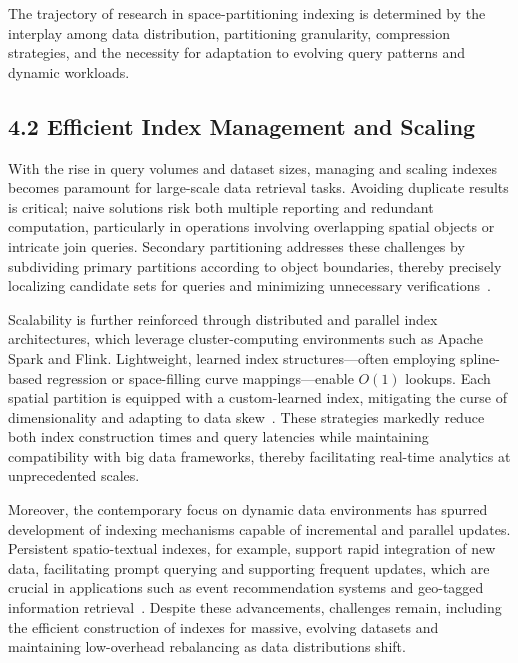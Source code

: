 \documentclass[11pt]{article}
\begin{document}
The trajectory of research in space-partitioning indexing is determined by the interplay among data distribution, partitioning granularity, compression strategies, and the necessity for adaptation to evolving query patterns and dynamic workloads.

\subsection{4.2 Efficient Index Management and Scaling}

With the rise in query volumes and dataset sizes, managing and scaling indexes becomes paramount for large-scale data retrieval tasks. Avoiding duplicate results is critical; naive solutions risk both multiple reporting and redundant computation, particularly in operations involving overlapping spatial objects or intricate join queries. Secondary partitioning addresses these challenges by subdividing primary partitions according to object boundaries, thereby precisely localizing candidate sets for queries and minimizing unnecessary verifications~\cite{ref114}.

Scalability is further reinforced through distributed and parallel index architectures, which leverage cluster-computing environments such as Apache Spark and Flink. Lightweight, learned index structures—often employing spline-based regression or space-filling curve mappings—enable $O(1)$ lookups. Each spatial partition is equipped with a custom-learned index, mitigating the curse of dimensionality and adapting to data skew~\cite{ref51,ref111}. These strategies markedly reduce both index construction times and query latencies while maintaining compatibility with big data frameworks, thereby facilitating real-time analytics at unprecedented scales.

Moreover, the contemporary focus on dynamic data environments has spurred development of indexing mechanisms capable of incremental and parallel updates. Persistent spatio-textual indexes, for example, support rapid integration of new data, facilitating prompt querying and supporting frequent updates, which are crucial in applications such as event recommendation systems and geo-tagged information retrieval~\cite{ref114,ref118}. Despite these advancements, challenges remain, including the efficient construction of indexes for massive, evolving datasets and maintaining low-overhead rebalancing as data distributions shift.
\end{document}
